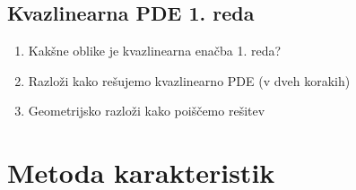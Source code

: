 \documentclass{article}
\begin{document}
    \subsection{Kvazlinearna PDE 1. reda}
    \begin{enumerate}
        \item Kakšne oblike je kvazlinearna enačba 1. reda?
        \item Razloži kako rešujemo kvazlinearno PDE (v dveh korakih)
        \item Geometrijsko razloži kako poiščemo rešitev
    \end{enumerate}

    \section{Metoda karakteristik}
\end{document}
